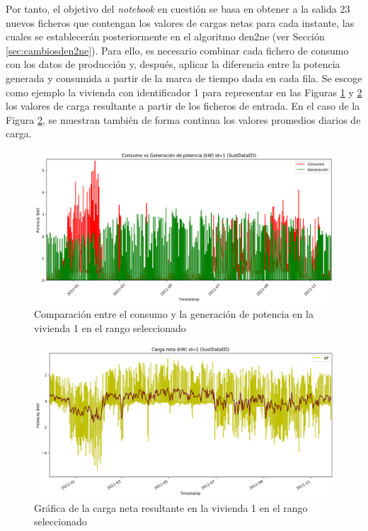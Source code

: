 \vspace{3mm}

Por tanto, el objetivo del \textit{notebook} en cuestión se basa en obtener a la salida 23 nuevos ficheros que contengan los valores de cargas netas para cada instante, las cuales se establecerán posteriormente en el algoritmo \gls{den2ne} (ver Sección \ref{sec:cambiosden2ne}). Para ello, es necesario combinar cada fichero de consumo con los datos de producción y, después, aplicar la diferencia entre la potencia generada y consumida a partir de la marca de tiempo dada en cada fila. Se escoge como ejemplo la vivienda con identificador 1 para representar en las Figuras \ref{fig:calculocarga} y \ref{fig:calculocarga2} los valores de carga resultante a partir de los ficheros de entrada. En el caso de la Figura \ref{fig:calculocarga2}, se muestran también de forma continua los valores promedios diarios de carga. 

\vspace{3mm}

\begin{figure}[H]
  \centering
  \includegraphics[width=1\textwidth]{img/diseno/calculocarga.png}
  \caption{Comparación entre el consumo y la generación de potencia en la vivienda 1 en el rango seleccionado}
  \label{fig:calculocarga}
\end{figure}

\begin{figure}[h!]
  \centering
  \includegraphics[width=1\textwidth]{img/diseno/calculocarga2.png}
  \caption{Gráfica de la carga neta resultante en la vivienda 1 en el rango seleccionado}
  \label{fig:calculocarga2}
\end{figure}

